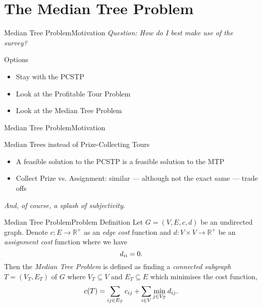 \documentclass[rgb,dvipsnames]{beamer}
\newcommand{\RR}{\mathbb{R}}      %
\begin{document}
\section{The Median Tree Problem}
\begin{frame}{Median Tree Problem}{Motivation}
  \textit{Question: How do I best make use of the survey?} \pause
  \begin{block}{Options}
  \begin{itemize}[<+->]
  \item Stay with the PCSTP
  \item Look at the Profitable Tour Problem
  \item Look at the Median Tree Problem
  \end{itemize}
  \end{block}
\end{frame}

\begin{frame}{Median Tree Problem}{Motivation}
  \begin{block}{Median Trees instead of Prize-Collecting Tours}
    \begin{itemize}
    \item A feasible solution to the PCSTP is a feasible solution to the MTP
    \item Collect Prize vs. Assignment: similar --- although not the exact same --- trade offs
    \end{itemize}
    \pause
    \textit{And, of course, a splash of subjectivity.}
  \end{block}
\end{frame}

\begin{frame}{Median Tree Problem}{Problem Definition}
  Let $G = (V, E, c, d)$ be an undirected graph. Denote $c : E \to \RR^+$ as an \textit{edge cost} function
and $d : V \times V  \to \RR^+$ be an \textit{assignment cost} function where we have
\[d_{ii} = 0 \mathnormal{.}\]
Then the \textit{Median Tree Problem}
is defined as finding a \textit{connected subgraph} $T = (V_T, E_T)$ of $G$
where $V_T \subseteq V$ and
$E_T \subseteq E$ which minimises the cost function,
\[c(T) = \sum_{ij \in E_T} c_{ij} + \sum_{i \in V} \min_{j \in V_T} d_{ij}\mathnormal{.}\]
\end{frame}
\end{document}
